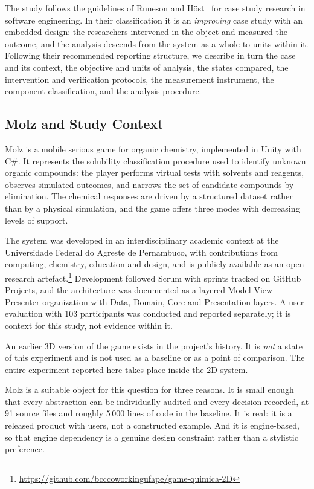\documentclass{sbc2019}%
\begin{document}
The study follows the guidelines of Runeson and H\"ost~\cite{runeson2009} for
case study research in software engineering. In their classification it is an
\emph{improving} case study with an embedded design: the researchers intervened
in the object and measured the outcome, and the analysis descends from the system
as a whole to units within it. Following their recommended reporting structure,
we describe in turn the case and its context, the objective and units of analysis,
the states compared, the intervention and verification protocols, the measurement
instrument, the component classification, and the analysis procedure.

\subsection{Molz and Study Context}

Molz is a mobile serious game for organic chemistry, implemented in Unity with
C\#. It represents the solubility classification procedure used to identify
unknown organic compounds: the player performs virtual tests with solvents and
reagents, observes simulated outcomes, and narrows the set of candidate
compounds by elimination. The chemical responses are driven by a structured
dataset rather than by a physical simulation, and the game offers three modes
with decreasing levels of support.

The system was developed in an interdisciplinary academic context at the
Universidade Federal do Agreste de Pernambuco, with contributions from
computing, chemistry, education and design, and is publicly available as an
open research artefact.\footnote{\url{https://github.com/bcccoworkingufape/game-quimica-2D}}
Development followed Scrum with sprints tracked on GitHub Projects, and the
architecture was documented as a layered Model-View-Presenter organization with
Data, Domain, Core and Presentation layers. A user evaluation with 103
participants was conducted and reported separately; it is context for this
study, not evidence within it.

An earlier 3D version of the game exists in the project's history. It is
\emph{not} a state of this experiment and is not used as a baseline or as a
point of comparison. The entire experiment reported here takes place inside the
2D system.

Molz is a suitable object for this question for three reasons. It is small
enough that every abstraction can be individually audited and every decision
recorded, at 91 source files and roughly 5\,000 lines of code in the baseline.
It is real: it is a released product with users, not a constructed example. And
it is engine-based, so that engine dependency is a genuine design constraint
rather than a stylistic preference.
\end{document}
